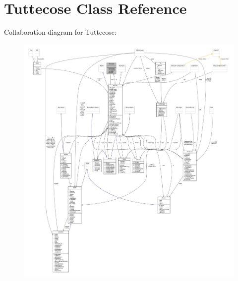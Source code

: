\hypertarget{classa_1_1survival_1_1game_1_1_tuttecose}{}\section{Tuttecose Class Reference}
\label{classa_1_1survival_1_1game_1_1_tuttecose}


Collaboration diagram for Tuttecose\+:
\nopagebreak
\begin{figure}[H]
\begin{center}
\leavevmode
\includegraphics[width=350pt]{classa_1_1survival_1_1game_1_1_tuttecose__coll__graph}
\end{center}
\end{figure}
